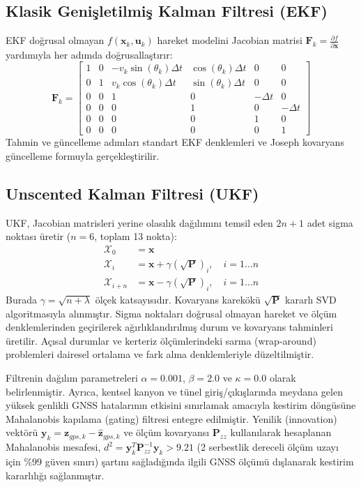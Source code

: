 ﻿\documentclass[conference]{IEEEtran}
\begin{document}
\subsection{Klasik Genişletilmiş Kalman Filtresi (EKF)}
EKF doğrusal olmayan $f(\mathbf{x}_k, \mathbf{u}_k)$ hareket modelini Jacobian matrisi $\mathbf{F}_k = \frac{\partial f}{\partial \mathbf{x}}$ yardımıyla her adımda doğrusallaştırır:
\begin{equation}
\mathbf{F}_k = 
\begin{bmatrix}
1 & 0 & -v_k \sin(\theta_k) \Delta t & \cos(\theta_k) \Delta t & 0 & 0 \\
0 & 1 & v_k \cos(\theta_k) \Delta t & \sin(\theta_k) \Delta t & 0 & 0 \\
0 & 0 & 1 & 0 & -\Delta t & 0 \\
0 & 0 & 0 & 1 & 0 & -\Delta t \\
0 & 0 & 0 & 0 & 1 & 0 \\
0 & 0 & 0 & 0 & 0 & 1
\end{bmatrix}
\end{equation}
Tahmin ve güncelleme adımları standart EKF denklemleri ve Joseph kovaryans güncelleme formuyla gerçekleştirilir.

\subsection{Unscented Kalman Filtresi (UKF)}
UKF, Jacobian matrisleri yerine olasılık dağılımını temsil eden $2n+1$ adet sigma noktası üretir ($n=6$, toplam 13 nokta):
\begin{align}
\mathcal{X}_{0} &= \mathbf{x} \\
\mathcal{X}_{i} &= \mathbf{x} + \gamma (\sqrt{\mathbf{P}})_i, \quad i=1 \dots n \\
\mathcal{X}_{i+n} &= \mathbf{x} - \gamma (\sqrt{\mathbf{P}})_i, \quad i=1 \dots n
\end{align}
Burada $\gamma = \sqrt{n+\lambda}$ ölçek katsayısıdır. Kovaryans karekökü $\sqrt{\mathbf{P}}$ kararlı SVD algoritmasıyla alınmıştır. Sigma noktaları doğrusal olmayan hareket ve ölçüm denklemlerinden geçirilerek ağırlıklandırılmış durum ve kovaryans tahminleri üretilir. Açısal durumlar ve kerteriz ölçümlerindeki sarma (wrap-around) problemleri dairesel ortalama ve fark alma denklemleriyle düzeltilmiştir.

Filtrenin dağılım parametreleri $\alpha = 0.001$, $\beta = 2.0$ ve $\kappa = 0.0$ olarak belirlenmiştir. Ayrıca, kentsel kanyon ve tünel giriş/çıkışlarında meydana gelen yüksek genlikli GNSS hatalarının etkisini sınırlamak amacıyla kestirim döngüsüne Mahalanobis kapılama (gating) filtresi entegre edilmiştir. Yenilik (innovation) vektörü $\mathbf{y}_k = \mathbf{z}_{gps, k} - \hat{\mathbf{z}}_{gps, k}$ ve ölçüm kovaryansı $\mathbf{P}_{zz}$ kullanılarak hesaplanan Mahalanobis mesafesi, $d^2 = \mathbf{y}_k^T \mathbf{P}_{zz}^{-1} \mathbf{y}_k > 9.21$ (2 serbestlik dereceli ölçüm uzayı için \%99 güven sınırı) şartını sağladığında ilgili GNSS ölçümü dışlanarak kestirim kararlılığı sağlanmıştır.
\end{document}
